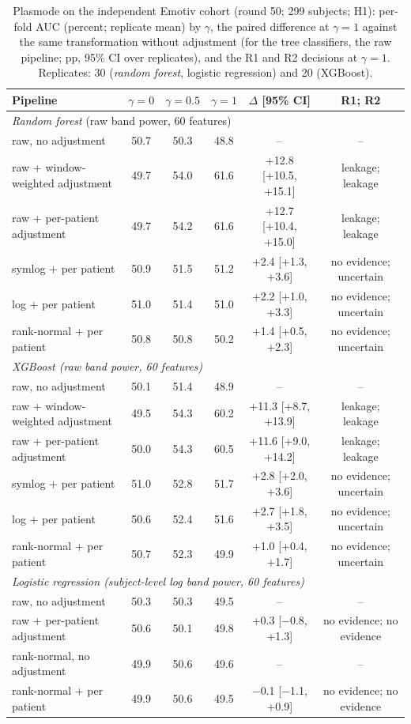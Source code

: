 \begin{table}[h]
\caption{Plasmode on the independent Emotiv cohort (round 50; 299 subjects; H1): per-fold AUC (percent; replicate mean) by $\gamma$, the paired difference at $\gamma=1$ against the same transformation without adjustment (for the tree classifiers, the raw pipeline; pp, 95\% CI over replicates), and the R1 and R2 decisions at $\gamma=1$. Replicates: 30 (\textit{random forest}, logistic regression) and 20 (XGBoost).}\label{tab:s2_emotiv}
\centering\scriptsize
\setlength{\tabcolsep}{2.5pt}
\begin{tabular}{p{}ccccc}
\toprule
Pipeline & $\gamma=0$ & $\gamma=0.5$ & $\gamma=1$ & $\Delta$ [95\% CI] & R1; R2 \\
\midrule
\multicolumn{6}{l}{\textit{Random forest} (raw band power, 60 features)} \\
\quad raw, no adjustment & 50.7 & 50.3 & 48.8 & -- & -- \\
\quad raw + window-weighted adjustment & 49.7 & 54.0 & 61.6 & +12.8 [+10.5, +15.1] & leakage; leakage \\
\quad raw + per-patient adjustment & 49.7 & 54.2 & 61.6 & +12.7 [+10.4, +15.0] & leakage; leakage \\
\quad symlog + per patient & 50.9 & 51.5 & 51.2 & +2.4 [+1.3, +3.6] & no evidence; uncertain \\
\quad log + per patient & 51.0 & 51.4 & 51.0 & +2.2 [+1.0, +3.3] & no evidence; uncertain \\
\quad rank-normal + per patient & 50.8 & 50.8 & 50.2 & +1.4 [+0.5, +2.3] & no evidence; uncertain \\
\multicolumn{6}{l}{\textit{XGBoost (raw band power, 60 features)}} \\
\quad raw, no adjustment & 50.1 & 51.4 & 48.9 & -- & -- \\
\quad raw + window-weighted adjustment & 49.5 & 54.3 & 60.2 & +11.3 [+8.7, +13.9] & leakage; leakage \\
\quad raw + per-patient adjustment & 50.0 & 54.3 & 60.5 & +11.6 [+9.0, +14.2] & leakage; leakage \\
\quad symlog + per patient & 51.0 & 52.8 & 51.7 & +2.8 [+2.0, +3.6] & no evidence; uncertain \\
\quad log + per patient & 50.6 & 52.4 & 51.6 & +2.7 [+1.8, +3.5] & no evidence; uncertain \\
\quad rank-normal + per patient & 50.7 & 52.3 & 49.9 & +1.0 [+0.4, +1.7] & no evidence; uncertain \\
\multicolumn{6}{l}{\textit{Logistic regression (subject-level log band power, 60 features)}} \\
\quad raw, no adjustment & 50.3 & 50.3 & 49.5 & -- & -- \\
\quad raw + per-patient adjustment & 50.6 & 50.1 & 49.8 & +0.3 [$-$0.8, +1.3] & no evidence; no evidence \\
\quad rank-normal, no adjustment & 49.9 & 50.6 & 49.6 & -- & -- \\
\quad rank-normal + per patient & 49.9 & 50.6 & 49.5 & $-$0.1 [$-$1.1, +0.9] & no evidence; no evidence \\
\bottomrule
\end{tabular}
\end{table}
